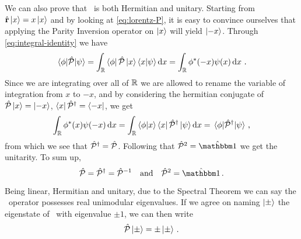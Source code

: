         We can also prove that \hP\ is both Hermitian and unitary. Starting from $\hat{\vb{r}}\ket{x} = x\ket{x}$ and by looking at \eqref{eq:lorentz-P}, it is easy to convince ourselves that applying the Parity Inversion operator on $\ket{x}$ will yield $\ket{-x}$. Through \eqref{eq:integral-identity} we have
        \begin{equation*}
            \mel{\phi}{\hP}{\psi}
            = \int\nolimits_{\bbR}\bra{\phi}\hP\ket{x}\bra{x}\ket{\psi}\dd{x}
            = \int\nolimits_{\bbR}\phi^*\pqty{-x}\psi\pqty{x}\dd{x}
            \myperiod
        \end{equation*}
        Since we are integrating over all of $\mathbb{R}$ we are allowed to rename the variable of integration from $x$ to $-x$, and by considering the hermitian conjugate of $\mathcal{\hat{P}}\ket{x} = \ket{-x}$, $\bra{x}\mathcal{\hat{P}}^\dag = \bra{-x}$, we get
        \begin{equation*}
            \int\nolimits_{\bbR}\phi^*\pqty{x}\psi\pqty{-x}\dd{x}
            = \int\nolimits_{\bbR}\bra{\phi}\ket{x}\bra{x}\hP^\dag\ket{\psi}\dd{x}
            = \mel{\phi}{\hP^\dag}{\psi}
            \mycomma
        \end{equation*}
        from which we see that $\mathcal{\hat{P}}^\dag = \mathcal{\hat{P}}$. Following that $\hP^2 = \togglehat{\idM}$ we get the unitarity. To sum up,
        \begin{equation}
            \label{eq:P-properties}
            \hP
            = \hP^\dag
            = \hP^{-1}
            \qand
            \hP^2
            = \togglehat{\idM}
            \myperiod
        \end{equation}

        Being linear, Hermitian and unitary, due to the Spectral Theorem we can say the \hP\ operator possesses real unimodular eigenvalues. If we agree on naming $\ket{\pm}$ the eigenstate of \hP\ with eigenvalue $\pm 1$, we can then write
        \begin{equation}
            \label{eq:eigenvalue-problem-P}
            \mathcal{\hat{P}}\ket{\pm}
            = \pm\ket{\pm}\,\text{.}
        \end{equation}
        
